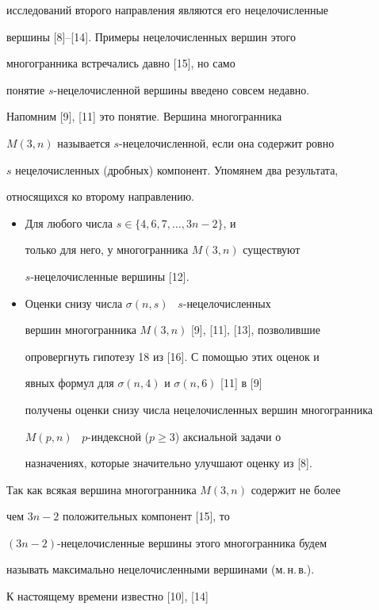 исследований второго направления являются его нецелочисленные


вершины [8]--[14]. Примеры нецелочисленных вершин этого


многогранника встречались давно [15], но само


понятие $s$-нецелочисленной вершины введено совсем недавно.


Напомним [9], [11] это понятие. Вершина многогранника


$M(3,n)$ называется $s$-нецелочисленной, если она содержит ровно


$s$ нецелочисленных (дробных) компонент. Упомянем два результата,


относящихся ко второму направлению.


\begin{itemize}


\item[1)] Для любого числа $s\in \{4,6,7,\dotsc,3n-2\}$, и


только для него, у многогранника $M(3,n)$ существуют


$s$-нецелочисленные вершины [12].


\item[2)] Оценки снизу числа $\sigma (n,s)$ \ $s$-нецелочисленных


вершин многогранника $M(3,n)$ [9], [11], [13], позволившие


опровергнуть гипотезу 18 из [16]. С помощью этих оценок и


явных формул для $\sigma (n,4)$ и $\sigma (n,6)$ [11] в [9]


получены оценки снизу числа нецелочисленных вершин многогранника


$M(p,n)$ \ $p$-индексной ($p\geq 3$) аксиальной задачи о


назначениях, которые значительно улучшают оценку из [8].


\end{itemize}





Так как всякая вершина многогранника $M(3,n)$ содержит не более


чем $3n-2$ положительных компонент [15], то


$(3n-2)$-нецелочисленные вершины этого многогранника будем


называть максимально нецелочисленными вершинами (м.\,н.\,в.).


К настоящему времени известно [10], [14]


